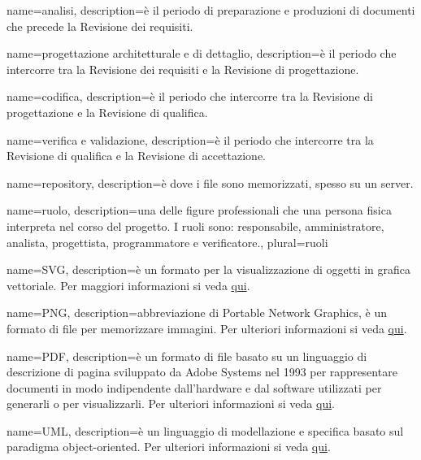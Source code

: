  {
	name=analisi,
	description={è il periodo di preparazione e produzioni di documenti che precede la Revisione dei requisiti.}
}

 {
	name=progettazione architetturale e di dettaglio,
	description={è il periodo che intercorre tra la Revisione dei requisiti e la Revisione di progettazione.}
}

 {
	name=codifica,
	description={è il periodo che intercorre tra la Revisione di progettazione e la Revisione di qualifica.}
}

 {
	name=verifica e validazione,
	description={è il periodo che intercorre tra la Revisione di qualifica e la Revisione di accettazione.}
}

 {
	name=repository,
	description={è dove i file sono memorizzati, spesso su un server.}
}

 {
	name=ruolo,
	description={una delle figure professionali che una persona fisica interpreta nel corso del progetto. I ruoli sono: responsabile, amministratore, analista, progettista, programmatore e verificatore.},
    plural=ruoli
}

 {
	name=SVG,
	description={è un formato per la visualizzazione di oggetti in grafica vettoriale. Per maggiori informazioni si veda \href{https://it.wikipedia.org/wiki/Scalable_Vector_Graphics}{qui}.}
}

 {
	name=PNG,
	description={abbreviazione di Portable Network Graphics, è un formato di file per memorizzare immagini. Per ulteriori informazioni si veda \href{http://it.wikipedia.org/wiki/Portable_Network_Graphics}{qui}.}
}

 {
	name=PDF,
	description={è un formato di file basato su un linguaggio di descrizione di pagina sviluppato da Adobe Systems nel 1993 per rappresentare documenti in modo indipendente dall’hardware e dal software utilizzati per generarli o per visualizzarli. Per ulteriori informazioni si veda \href{http://it.wikipedia.org/wiki/Portable_Document_Format}{qui}.}
}

 {
	name=UML,
	description={è un linguaggio di modellazione e specifica basato sul paradigma object-oriented. Per ulteriori informazioni si veda \href{http://it.wikipedia.org/wiki/Unified_Modeling_Language}{qui}.}
}

